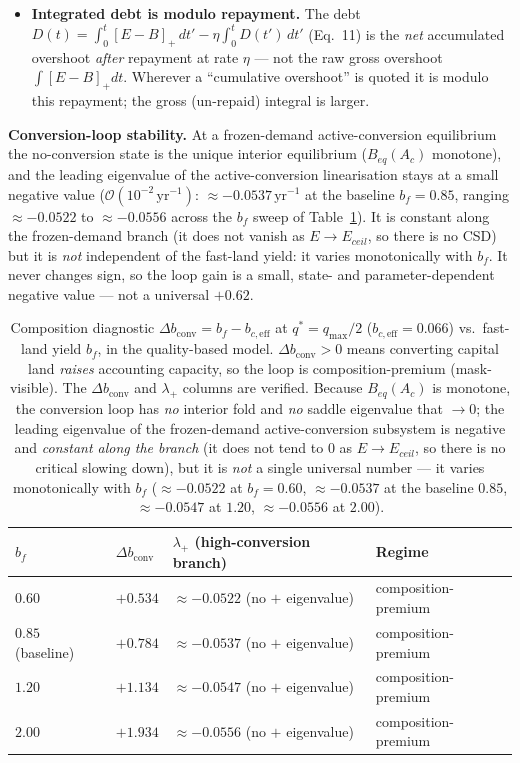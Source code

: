 \documentclass[11pt]{article}
\begin{document}
\begin{itemize}
\item \textbf{Integrated debt is modulo repayment.} The debt $D(t)=\int_0^t[E-B]_+\,dt'-\eta\int_0^tD(t')\,dt'$ (Eq.~11) is the \emph{net} accumulated overshoot \emph{after} repayment at rate $\eta$ --- not the raw gross overshoot $\int[E-B]_+dt$. Wherever a ``cumulative overshoot'' is quoted it is modulo this repayment; the gross (un-repaid) integral is larger.
\end{itemize}

\noindent\textbf{Conversion-loop stability.} At a frozen-demand
active-conversion equilibrium the no-conversion state is the unique interior equilibrium ($B_{eq}(A_c)$ monotone),
and the leading eigenvalue of the active-conversion linearisation stays at a small negative value
($\mathcal{O}(10^{-2}\,\text{yr}^{-1})$: $\approx-0.0537\,\text{yr}^{-1}$ at the baseline $b_f=0.85$, ranging
$\approx-0.0522$ to $\approx-0.0556$ across the $b_f$ sweep of Table~\ref{tab:conv}). It is constant along the
frozen-demand branch (it does not vanish as $E\to E_{ceil}$, so there is no CSD) but it is \emph{not} independent
of the fast-land yield: it varies monotonically with $b_f$. It never changes sign, so the loop gain is a
small, state- and parameter-dependent negative value --- not a universal $+0.62$.

\begin{table}[htbp]
\centering
\small
\begin{tabularx}{\textwidth}{ll>{\raggedright\arraybackslash}X>{\raggedright\arraybackslash}X}
\toprule
$b_f$ & $\Delta b_{\mathrm{conv}}$ & $\lambda_+$ (high-conversion branch) & Regime \\
\midrule
$0.60$ & $+0.534$ & $\approx-0.0522$ (no $+$ eigenvalue) & composition-premium \\
$0.85$ (baseline) & $+0.784$ & $\approx-0.0537$ (no $+$ eigenvalue) & composition-premium \\
$1.20$ & $+1.134$ & $\approx-0.0547$ (no $+$ eigenvalue) & composition-premium \\
$2.00$ & $+1.934$ & $\approx-0.0556$ (no $+$ eigenvalue) & composition-premium \\
\bottomrule
\end{tabularx}
\caption{Composition diagnostic $\Delta b_{\mathrm{conv}}=b_f-b_{c,\mathrm{eff}}$ at $q^*=q_{\max}/2$
($b_{c,\mathrm{eff}}=0.066$) vs.\ fast-land yield $b_f$, in the quality-based model. $\Delta b_{\mathrm{conv}}>0$
means converting capital land \emph{raises} accounting capacity, so the loop is composition-premium
(mask-visible). The $\Delta b_{\mathrm{conv}}$ and $\lambda_+$ columns are verified. Because $B_{eq}(A_c)$ is
monotone, the conversion loop has \emph{no} interior fold and \emph{no} saddle eigenvalue that $\to0$; the
leading eigenvalue of the frozen-demand active-conversion subsystem is negative and \emph{constant along the
branch} (it does not tend to $0$ as $E\to E_{ceil}$, so there is no critical slowing down), but it is
\emph{not} a single universal number --- it varies monotonically with $b_f$ ($\approx-0.0522$ at
$b_f=0.60$, $\approx-0.0537$ at the baseline $0.85$, $\approx-0.0547$ at $1.20$, $\approx-0.0556$ at $2.00$).}
\label{tab:conv}
\end{table}
\end{document}
